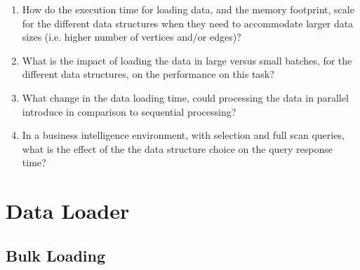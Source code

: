 {\begin{enumerate}
\item How do the execution time for loading data, and the memory footprint, scale for the different data structures when they need to accommodate larger data sizes (i.e. higher number of vertices and/or edges)? 
\item What is the impact of loading the data in large versus small batches, for the different data structures, on the performance on this task?
\item What change in the data loading time, could processing the data in parallel introduce in comparison to sequential processing?
\item In a business intelligence environment, with selection and full scan queries, what is the effect of the the data structure choice on the query response time?%

\end{enumerate}





\section{Data Loader}
\label{dataLoader}
\subsection{Bulk Loading}
}

